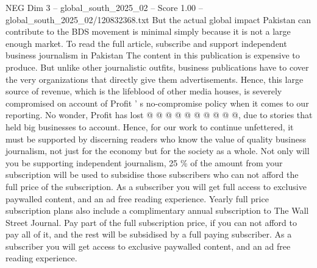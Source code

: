 \begin{textsample}{NEG Dim 3 – global\_south\_2025\_02 – Score 1.00 – global\_south\_2025\_02/120832368.txt}
But the actual global impact Pakistan can contribute to the BDS movement is minimal simply because it is not a large enough market.
To read the full article, subscribe and support independent business journalism in Pakistan The content in this publication is expensive to produce.
But unlike other journalistic outfits, business publications have to cover the very organizations that directly give them advertisements.
Hence, this large source of revenue, which is the lifeblood of other media houses, is severely compromised on account of Profit ' s no-compromise policy when it comes to our reporting.
No wonder, Profit has lost @ @ @ @ @ @ @ @ @ @, due to stories that held big businesses to account.
Hence, for our work to continue unfettered, it must be supported by discerning readers who know the value of quality business journalism, not just for the economy but for the society as a whole.
Not only will you be supporting independent journalism, 25 \% of the amount from your subscription will be used to subsidise those subscribers who can not afford the full price of the subscription.
As a subscriber you will get full access to exclusive paywalled content, and an ad free reading experience.
Yearly full price subscription plans also include a complimentary annual subscription to The Wall Street Journal.
Pay part of the full subscription price, if you can not afford to pay all of it, and the rest will be subsidised by a full paying subscriber.
As a subscriber you will get access to exclusive paywalled content, and an ad free reading experience.

\end{textsample}
